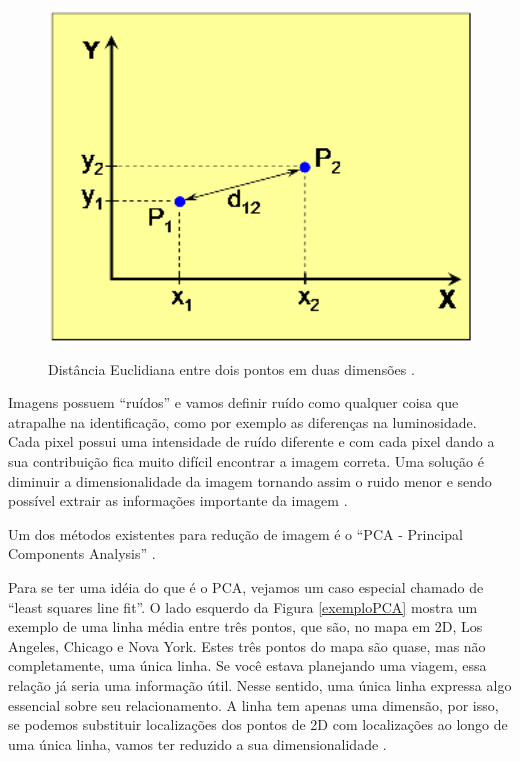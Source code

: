     \begin{figure}[hbt]
		\begin{center}
			\includegraphics[height=9.5cm,width=12.5cm]{figuras/2.FundamentacaoTeorica/graficoDistanciaEntrePontos.png}
		\end{center}
		\caption{Distância Euclidiana entre dois pontos em duas dimensões \cite{hewitt}.}
		\label{distanciaEntrePontos}
	\end{figure}


Imagens possuem ``ruídos'' e vamos definir ruído como qualquer coisa que atrapalhe na identificação, como por exemplo as diferenças na luminosidade. Cada pixel possui uma intensidade de ruído diferente e com cada pixel dando a sua contribuição fica muito difícil encontrar a imagem correta. Uma solução é diminuir a dimensionalidade da imagem tornando assim o ruido menor e sendo possível extrair as informações importante da imagem \cite{hewitt}.

Um dos métodos existentes para redução de imagem é o ``PCA - Principal Components Analysis'' \cite{hewitt}.

Para se ter uma idéia do que é o PCA, vejamos um caso especial chamado de ``least squares line fit''. O lado esquerdo da Figura \ref{exemploPCA} mostra um exemplo de uma linha média entre três pontos, que são, no mapa em 2D, Los Angeles, Chicago e Nova York. Estes três pontos do mapa são quase, mas não completamente, uma única linha. Se você estava planejando uma viagem, essa relação já seria uma informação útil. Nesse sentido, uma única linha expressa algo essencial sobre seu relacionamento. A linha tem apenas uma dimensão, por isso, se podemos substituir localizações dos pontos de 2D com localizações ao longo de uma única linha, vamos ter reduzido a sua dimensionalidade \cite{hewitt}.

